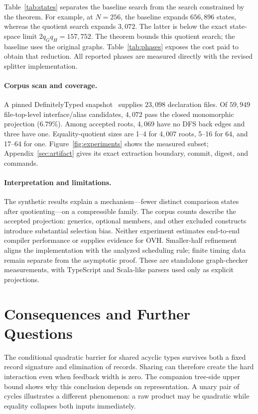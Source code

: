 \documentclass[11pt,letterpaper]{article}
\theoremstyle{definition}\newtheorem{definition}[theorem]{Definition}
\begin{document}


Table~\ref{tab:states} separates the baseline search from the search constrained by the theorem. For example, at $N=256$, the baseline expands $656,896$ states, whereas the quotient search expands $3,072$. The latter is below the exact state-space limit $2q_Gq_H=157,752$. The theorem bounds this quotient search; the baseline uses the original graphs. Table~\ref{tab:phases} exposes the cost paid to obtain that reduction. All reported phases are measured directly with the revised splitter implementation.



\paragraph{Corpus scan and coverage.}
A pinned DefinitelyTyped snapshot~\cite{DT} supplies $23,098$ declaration files. Of $59,949$ file-top-level interface/alias candidates, $4,072$ pass the closed monomorphic projection ($6.79\%$). Among accepted roots, $4,069$ have no DFS back edges and three have one. Equality-quotient sizes are 1--4 for $4,007$ roots, 5--16 for $64$, and 17--64 for one. Figure~\ref{fig:experiments} shows the measured subset; Appendix~\ref{sec:artifact} gives its exact extraction boundary, commit, digest, and commands.

\paragraph{Interpretation and limitations.}
The synthetic results explain a mechanism---fewer distinct comparison states after quotienting---on a compressible family. The corpus counts describe the accepted projection: generics, optional members, and other excluded constructs introduce substantial selection bias. Neither experiment estimates end-to-end compiler performance or supplies evidence for OVH. Smaller-half refinement aligns the implementation with the analyzed scheduling rule; finite timing data remain separate from the asymptotic proof. These are standalone graph-checker measurements, with TypeScript and Scala-like parsers used only as explicit projections.
\FloatBarrier

\section{Consequences and Further Questions}\label{sec:related}
The conditional quadratic barrier for shared acyclic types survives both a fixed record signature and elimination of records. Sharing can therefore create the hard interaction even when feedback width is zero. The companion tree-side upper bound shows why this conclusion depends on representation. A unary pair of cycles illustrates a different phenomenon: a raw product may be quadratic while equality collapses both inputs immediately.
\end{document}
